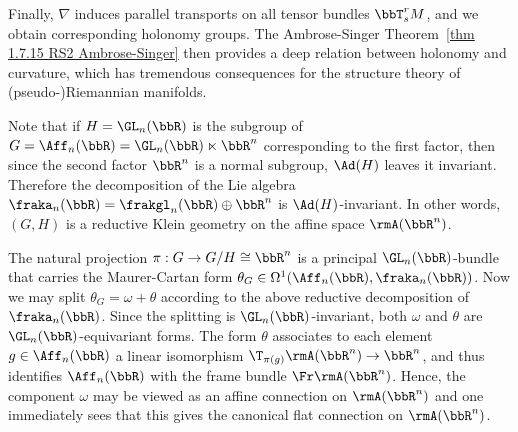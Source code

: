 Finally, $\nabla$ induces parallel transports on all tensor bundles $\bbT^r_s M$, and we obtain corresponding holonomy groups. The Ambrose-Singer Theorem~\ref{thm 1.7.15 RS2 Ambrose-Singer} then provides a deep relation between holonomy and curvature, which has tremendous consequences for the structure theory of (pseudo-)Riemannian manifolds.


\begin{rem}\label{rem 1.3.5 Cap}
    Note that if $H=\GL_n(\bbR)$ is the subgroup of $G=\Aff_n(\bbR)=\GL_n(\bbR)\ltimes \bbR^n$ corresponding to the first factor, then since the second factor $\bbR^n$ is a normal subgroup, $\Ad(H)$ leaves it invariant. Therefore the decomposition of the Lie algebra $\fraka_n(\bbR)=\frakgl_n(\bbR)\oplus \bbR^n$ is $\Ad(H)$-invariant. In other words, $(G,H)$ is a reductive Klein geometry on the affine space $\rmA(\bbR^n)$.

    The natural projection $\pi:G\to G\slash H\cong \bbR^n$ is a principal $\GL_n(\bbR)$-bundle that carries the Maurer-Cartan form $\theta_G\in\Omega^1(\Aff_n(\bbR),\fraka_n(\bbR))$. Now we may split $\theta_G=\omega+\theta$ according to the above reductive decomposition of $\fraka_n(\bbR)$. Since the splitting is $\GL_n(\bbR)$-invariant, both $\omega$ and $\theta$ are $\GL_n(\bbR)$-equivariant forms. The form $\theta$ associates to each element $g\in \Aff_n(\bbR)$ a linear isomorphism $\T_{\pi(g)}\rmA(\bbR^n)\to \bbR^n$, and thus identifies $\Aff_n(\bbR)$ with the frame bundle $\Fr \rmA(\bbR^n)$. Hence, the component $\omega$ may be viewed as an affine connection on $\rmA(\bbR^n)$ and one immediately sees that this gives the canonical flat connection on $\rmA(\bbR^n)$.
\end{rem}

